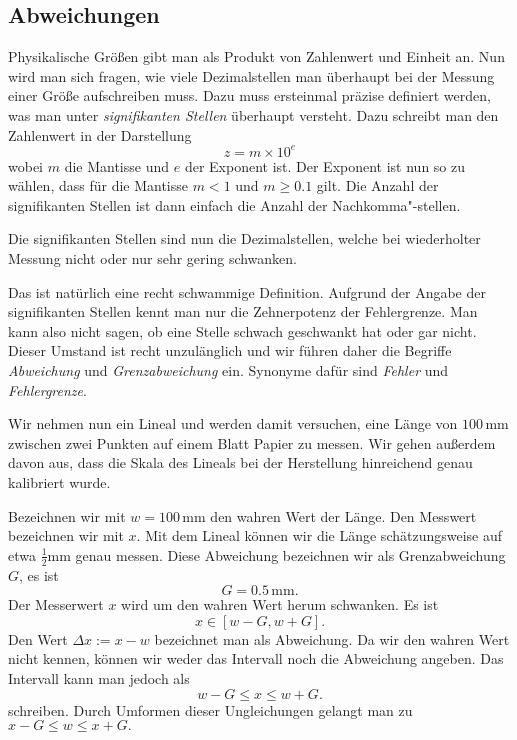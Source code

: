 \documentclass[a4paper,11pt,fleqn,twocolumn,twoside,dvipdfmx]{scrartcl}
\numberwithin{equation}{section}
\begin{document}
\subsection{Abweichungen}

Physikalische Größen gibt man als Produkt von Zahlenwert und Einheit
an. Nun wird man sich fragen, wie viele Dezimalstellen man überhaupt
bei der Messung einer Größe aufschreiben muss. Dazu muss ersteinmal
präzise definiert werden, was man unter
\textit{signifikanten Stellen} überhaupt versteht. Dazu schreibt man
den Zahlenwert in der Darstellung
\begin{equation}
z = m\times 10^{e}
\end{equation}
wobei $m$ die Mantisse und $e$ der Exponent ist. Der Exponent
ist nun so zu wählen, dass für die Mantisse $m<1$ und $m\ge 0.1$
gilt. Die Anzahl der signifikanten Stellen ist dann einfach die
Anzahl der Nachkomma"-stellen.

Die signifikanten Stellen sind nun die Dezimalstellen, welche bei
wiederholter Messung nicht oder nur sehr gering schwanken.

Das ist natürlich eine recht schwammige Definition. Aufgrund der
Angabe der signifikanten Stellen kennt man nur die Zehnerpotenz
der Fehlergrenze. Man kann also nicht sagen, ob eine Stelle schwach
geschwankt hat oder gar nicht. Dieser Umstand ist recht unzulänglich
und wir führen daher die Begriffe \emph{Abweichung} und
\emph{Grenzabweichung} ein. Synonyme dafür sind \emph{Fehler} und
\emph{Fehlergrenze}.

Wir nehmen nun ein Lineal und werden damit versuchen, eine Länge
von $100\,\mathrm{mm}$
zwischen zwei Punkten auf einem Blatt Papier zu messen. Wir gehen
außerdem davon aus, dass die Skala des Lineals bei der Herstellung
hinreichend genau kalibriert wurde.

Bezeichnen wir mit $w=100\,\mathrm{mm}$ den wahren Wert der Länge.
Den Messwert bezeichnen wir mit $x$. Mit dem Lineal können wir
die Länge schätzungsweise auf etwa $\frac{1}{2}\mathrm{mm}$ genau
messen. Diese Abweichung bezeichnen wir als Grenzabweichung $G$,
es ist
\begin{equation}
G = 0.5\,\mathrm{mm}.
\end{equation}
Der Messerwert $x$ wird um den wahren Wert herum schwanken. Es ist
\begin{equation}
x\in [w-G,w+G].
\end{equation}
Den Wert $\Delta x := x-w$ bezeichnet man als Abweichung. Da wir
den wahren Wert nicht kennen, können wir weder das Intervall noch
die Abweichung angeben. Das Intervall kann man jedoch als
\begin{equation}
w-G\le x\le w+G.
\end{equation}
schreiben. Durch Umformen dieser Ungleichungen gelangt man zu
$x-G\le w\le x+G.$
\end{document}
